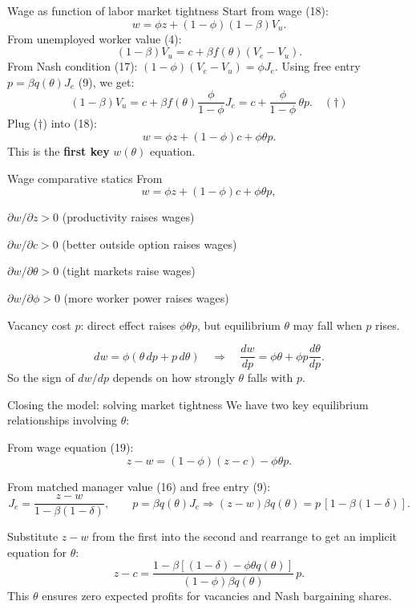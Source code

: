 \documentclass[aspectratio=169,xcolor=dvipsnames]{beamer}
\let\tempone\itemize
\let\temptwo\enditemize
\renewenvironment{itemize}{\tempone\addtolength{\itemsep}{\fill}}{\temptwo}
\begin{document}
\begin{frame}{Wage as function of labor market tightness}
\label{slide:MP_41_WageTheta}
\small
Start from wage (18):
\[
w = \phi z + (1-\phi)(1-\beta)V_u.
\]
From unemployed worker value (4):
\[
(1-\beta)V_u = c + \beta f(\theta)(V_e-V_u).
\]
From Nash condition (17): \((1-\phi)(V_e-V_u)=\phi J_e\).
Using free entry \(p=\beta q(\theta)J_e\) (9), we get:
\[
(1-\beta)V_u
= c + \beta f(\theta)\frac{\phi}{1-\phi}J_e
= c + \frac{\phi}{1-\phi}\,\theta p.
\quad (\dagger)
\]
Plug (\(\dagger\)) into (18):
\[
w = \phi z + (1-\phi)c + \phi\theta p.
\tag{19}
\]
This is the \textbf{first key} \(w(\theta)\) equation.
\end{frame}

\begin{frame}{Wage comparative statics}
\label{slide:MP_42_WageCS}
\small
From
\[
w = \phi z + (1-\phi)c + \phi\theta p,
\tag{19}
\]
\begin{itemize}
    \item \(\partial w/\partial z>0\) (productivity raises wages)
    \item \(\partial w/\partial c>0\) (better outside option raises wages)
    \item \(\partial w/\partial \theta>0\) (tight markets raise wages)
    \item \(\partial w/\partial \phi>0\) (more worker power raises wages)
    \item Vacancy cost \(p\): direct effect raises \(\phi\theta p\), but equilibrium \(\theta\) may fall when \(p\) rises.
\end{itemize}

\[
dw = \phi(\theta\,dp + p\,d\theta)
\quad\Rightarrow\quad
\frac{dw}{dp}=\phi\theta + \phi p\frac{d\theta}{dp}.
\]
So the sign of \(dw/dp\) depends on how strongly \(\theta\) falls with \(p\).
\end{frame}

\begin{frame}{Closing the model: solving market tightness}
\label{slide:MP_43_CloseModel}
\small
We have two key equilibrium relationships involving \(\theta\):

\begin{itemize}
    \item From wage equation (19):
    \[
        z-w = (1-\phi)(z-c) - \phi\theta p.
    \]
    \item From matched manager value (16) and free entry (9):
    \[
        J_e=\frac{z-w}{1-\beta(1-\delta)},
        \qquad
        p=\beta q(\theta)J_e
        \Rightarrow
        (z-w)\beta q(\theta)=p\,[1-\beta(1-\delta)].
    \]
\end{itemize}

Substitute \(z-w\) from the first into the second and rearrange to get an implicit equation for \(\theta\):
\[
z-c
=
\frac{1-\beta[(1-\delta)-\phi\theta q(\theta)]}{(1-\phi)\beta q(\theta)}\,p.
\tag{20}
\]
This \(\theta\) ensures zero expected profits for vacancies and Nash bargaining shares.
\end{frame}
\end{document}
